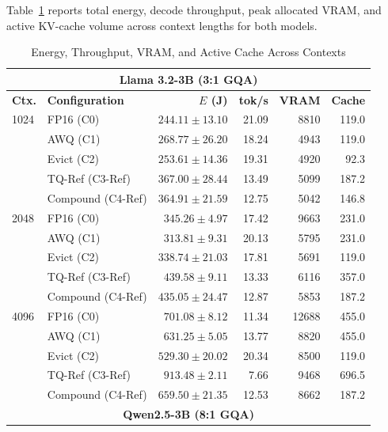 \documentclass[conference,a4paper]{IEEEtran}
\begin{document}
Table~\ref{tab:energy-scaling} reports total energy, decode throughput, peak allocated VRAM, and active KV-cache volume across context lengths for both models.

\begin{table}[t]
\caption{Energy, Throughput, VRAM, and Active Cache Across Contexts}
\label{tab:energy-scaling}
\centering\footnotesize
\setlength{\tabcolsep}{1.4pt}
\renewcommand{\arraystretch}{0.78}
\begin{tabular*}{\columnwidth}{@{\extracolsep{\fill}}llrrrr@{}}
\toprule
\multicolumn{6}{c}{\textbf{Llama 3.2-3B (3:1 GQA)}} \\
\midrule
\textbf{Ctx.} & \textbf{Configuration} & \textbf{$E$ (J)} & \textbf{tok/s} & \textbf{VRAM} & \textbf{Cache} \\
\midrule
1024 & FP16 (C0)          & $244.11 \pm 13.10$ & 21.09 & 8810  & 119.0 \\
     & AWQ (C1)           & $268.77 \pm 26.20$ & 18.24 & 4943  & 119.0 \\
     & Evict (C2)         & $253.61 \pm 14.36$ & 19.31 & 4920  &  92.3 \\
     & TQ-Ref (C3-Ref)    & $367.00 \pm 28.44$ & 13.49 & 5099  & 187.2 \\
     & Compound (C4-Ref)  & $364.91 \pm 21.59$ & 12.75 & 5042  & 146.8 \\
\midrule
2048 & FP16 (C0)          & $345.26 \pm 4.97$  & 17.42 & 9663  & 231.0 \\
     & AWQ (C1)           & $313.81 \pm 9.31$  & 20.13 & 5795  & 231.0 \\
     & Evict (C2)         & $338.74 \pm 21.03$ & 17.81 & 5691  & 119.0 \\
     & TQ-Ref (C3-Ref)    & $439.58 \pm 9.11$  & 13.33 & 6116  & 357.0 \\
     & Compound (C4-Ref)  & $435.05 \pm 24.47$ & 12.87 & 5853  & 187.2 \\
\midrule
4096 & FP16 (C0)          & $701.08 \pm 8.12$  & 11.34 & 12688 & 455.0 \\
     & AWQ (C1)           & $631.25 \pm 5.05$  & 13.77 & 8820  & 455.0 \\
     & Evict (C2)         & $529.30 \pm 20.02$ & 20.34 & 8500  & 119.0 \\
     & TQ-Ref (C3-Ref)    & $913.48 \pm 2.11$  &  7.66 & 9468  & 696.5 \\
     & Compound (C4-Ref)  & $659.50 \pm 21.35$ & 12.53 & 8662  & 187.2 \\
\midrule
\multicolumn{6}{c}{\textbf{Qwen2.5-3B (8:1 GQA)}} \\

\end{tabular*}
\end{table}
\end{document}
